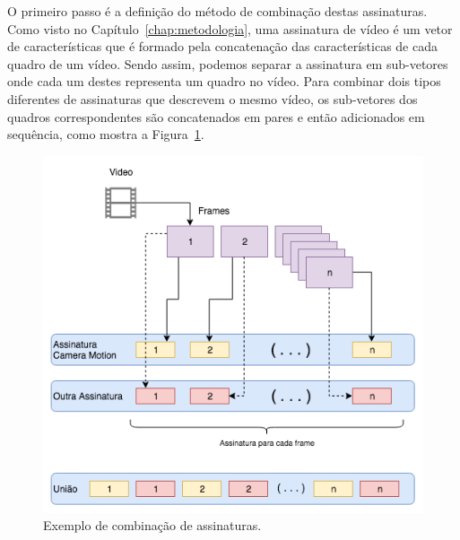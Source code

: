 

O primeiro passo é a definição do método de combinação destas assinaturas. Como visto no Capítulo~\ref{chap:metodologia}, uma assinatura de vídeo é um vetor de características que é formado pela concatenação das características de cada quadro de um vídeo. Sendo assim, podemos separar a assinatura em sub-vetores onde cada um destes representa um quadro no vídeo. Para combinar dois tipos diferentes de assinaturas que descrevem o mesmo vídeo, os sub-vetores dos quadros correspondentes são concatenados em pares e então adicionados em sequência, como mostra a Figura~\ref{fig:combinacao-exemplo}. 

\begin{figure}
	\caption{Exemplo de combinação de assinaturas.}
	\label{fig:combinacao-exemplo}
	\includegraphics[width=\textwidth]{dados/figuras/experimentos/juncao_exemplo.png}
\end{figure}


